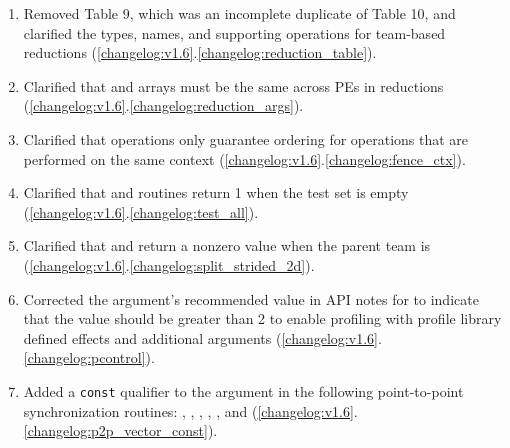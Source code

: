 \begin{enumerate}
  \item Removed \openshmem[1.5] Table 9, which was an incomplete duplicate of
      \openshmem[1.5] Table 10, and clarified the types, names, and supporting
      operations for team-based reductions
        (\ref{changelog:v1.6}.\ref{changelog:reduction_table}).
  \item Clarified that  and  arrays must be the same
      across \acp{PE} in \openshmem reductions
        (\ref{changelog:v1.6}.\ref{changelog:reduction_args}).
  \item Clarified that  operations only guarantee ordering for operations
     that are performed on the same context
        (\ref{changelog:v1.6}.\ref{changelog:fence_ctx}).
  \item Clarified that  and
      routines return 1 when the test set is empty
        (\ref{changelog:v1.6}.\ref{changelog:test_all}).
  \item Clarified that  and
      return a nonzero value when the parent team is
        (\ref{changelog:v1.6}.\ref{changelog:split_strided_2d}).
  \item Corrected the  argument's recommended value in API notes for
      to indicate that the value should be greater than 2 to enable
     profiling with profile library defined effects and additional arguments
        (\ref{changelog:v1.6}.\ref{changelog:pcontrol}).
  \item Added a \texttt{const} qualifier to the  argument in the
     following point-to-point synchronization routines:
     ,
     ,
     ,
     , , and
        (\ref{changelog:v1.6}.\ref{changelog:p2p_vector_const}).
\end{enumerate}

